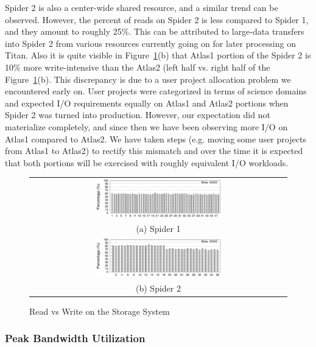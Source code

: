Spider 2 is also a center-wide shared resource, and a similar trend can be
observed. However, the percent of reads on Spider 2 is less compared to Spider
1, and they amount to roughly 25\%. This can be attributed to large-data
transfers into Spider 2 from various resources currently going on for later
processing on Titan. Also it is quite visible in Figure~\ref{fig:rwratio}(b)
that Atlas1 portion of the Spider 2 is 10\% more write-intensive than the
Atlas2 (left half vs. right half of the Figure~\ref{fig:rwratio}(b). This
discrepancy is due to a user project allocation problem we encountered early
on. User projects were categorized in terms of science domains and expected I/O
requirements equally on Atlas1 and Atlas2 portions when Spider 2 was turned
into production. However, our expectation did not materialize completely, and
since then we have been observing more I/O on Atlas1 compared to Atlas2. We
have taken steps (e.g. moving some user projects from Atlas1 to Atlas2) to
rectify this mismatch and over the time it is expected that both portions will
be exercised with roughly equivalent I/O workloads. 

\begin{figure}[!t]
\begin{center}
\begin{tabular}{c}
{\includegraphics[width=0.5\textwidth]{./figs/spider1-wr-ratio.eps}}\\
{(a) Spider 1}\\
{\includegraphics[width=0.5\textwidth]{./figs/spider2-wr-ratio.eps}}\\
{(b) Spider 2}\\
\end{tabular}
\vspace{-0.1in}
\caption{Read vs Write on the Storage System}
\label{fig:rwratio}
\end{center}
\end{figure}

\subsubsection{Peak Bandwidth Utilization}

